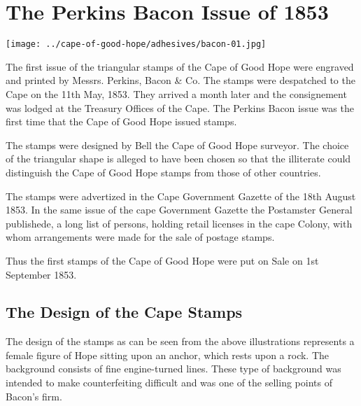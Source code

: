 \chapter{The Perkins Bacon Issue of 1853}

\begin{marginfigure} 
\texttt{[image: ../cape-of-good-hope/adhesives/bacon-01.jpg]}
\end{marginfigure}

The first issue of the triangular stamps of the Cape of Good Hope were engraved and printed by Messrs. Perkins, Bacon \& Co. The stamps were despatched to the Cape on the 11th May, 1853. They arrived a month later and the consignement was lodged at the Treasury Offices of the Cape. The Perkins Bacon issue was the first time that the Cape of Good Hope issued stamps.

The stamps were designed by Bell the Cape of Good Hope surveyor. The choice of the triangular shape is alleged to have been chosen so that the illiterate could distinguish the Cape of Good Hope stamps from those of other countries.

The stamps were advertized in the Cape Government Gazette of the 18th August 1853. In the same issue of the cape Government Gazette the Postamster General publishede, a long list of persons, holding retail licenses in the cape Colony, with whom arrangements were made for the sale of postage stamps.

Thus the first stamps of the Cape of Good Hope were put on Sale on 1st September 1853.

\section{The Design of the Cape Stamps}

The design of the stamps as can be seen from the above illustrations represents a female figure of Hope sitting upon an anchor, which rests upon a rock. The background consists of fine engine-turned lines. These type of background was intended to make counterfeiting difficult and was one of the selling points of Bacon's firm.



